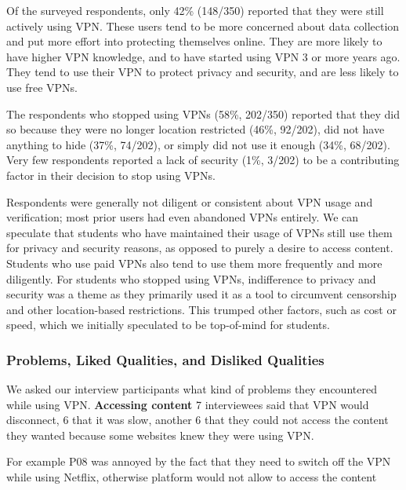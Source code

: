 Of the surveyed respondents, only 42\% (148/350) reported that they were still actively using VPN. These users tend to be more concerned about data collection and put more effort into protecting themselves online. They are more likely to have higher VPN knowledge, and to have started using VPN 3 or more years ago. They tend to use their VPN to protect privacy and security, and are less likely to use free VPNs.

The respondents who stopped using VPNs (58\%, 202/350) reported that they did so because they were no longer location restricted (46\%, 92/202), did not have anything to hide (37\%, 74/202), or simply did not use it enough (34\%, 68/202). Very few respondents reported a lack of security (1\%, 3/202) to be a contributing factor in their decision to stop using VPNs.

Respondents were generally not diligent or consistent about VPN usage and verification; most prior users had even abandoned VPNs entirely. We can speculate that students who have maintained their usage of VPNs still use them for privacy and security reasons, as opposed to purely a desire to access content. Students who use paid VPNs also tend to use them more frequently and more diligently. For students who stopped using VPNs, indifference to privacy and security was a theme as they primarily used it as a tool to circumvent censorship and other location-based restrictions. This trumped other factors, such as cost or speed, which we initially speculated to be top-of-mind for students.

\subsubsection{Problems, Liked Qualities, and Disliked Qualities}
We asked our interview participants what kind of problems they encountered while using VPN. 
\textbf{Accessing content} 7 interviewees said that VPN would disconnect, 6 that it was slow, another 6 that they could not access the content they wanted because some websites knew they were using VPN. 


For example P08 was annoyed by the fact that they need to switch off the VPN while using Netflix, otherwise platform would not allow to access the content

